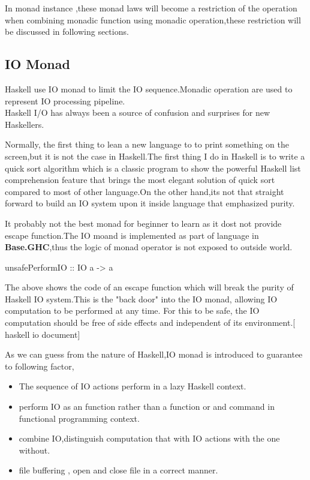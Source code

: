 In monad instance ,these monad laws will become a restriction of the operation when combining monadic function using monadic operation,these restriction will be discussed in following sections.


\subsection{IO Monad}
Haskell use IO monad to limit the IO sequence.Monadic operation are used to represent IO processing pipeline.\\

Haskell I/O has always been a source of confusion and surprises for new Haskellers.

Normally, the first thing to lean a new language to to print something on the screen,but it is not the case in Haskell.The first thing I do in Haskell is to write a quick sort algorithm which is a classic program to show the powerful Haskell list comprehension feature that brings the most elegant solution of quick sort compared to most of other language.On the other hand,its not that straight forward to build an IO system upon it inside language that emphasized purity.



It probably not the best monad for beginner to learn as it dost not provide escape function.The IO moand is implemented as part of language in \textbf{Base.GHC},thus the logic of monad operator is not exposed to outside world.

\begin{hcode}
unsafePerformIO :: IO a -> a
\end{hcode}

The above shows the code of an escape function which will break the purity of Haskell IO system.This is the "back door" into the IO monad, allowing IO computation to be performed at any time. For this to be safe, the IO computation should be free of side effects and independent of its environment.[ haskell io document]


As we can guess from the nature of Haskell,IO monad is introduced to guarantee to following factor,

\begin{itemize}
\item The sequence of IO actions perform in a lazy Haskell context.
\item perform IO as an function rather than a function or and command in functional programming context.
\item combine IO,distinguish computation that with IO actions with the one without.
\item  file buffering , open and close file in a correct manner.
\end{itemize}


